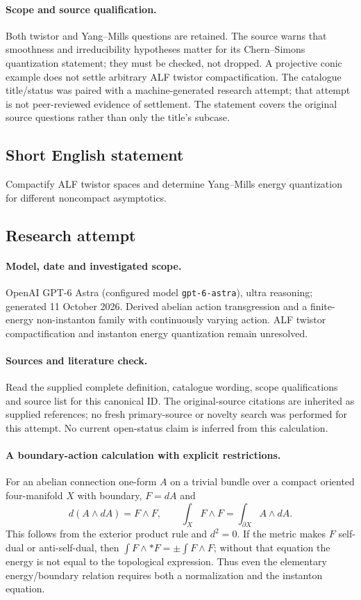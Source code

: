 \documentclass[11pt]{article}
\begin{document}
\paragraph{Scope and source qualification.}Both twistor and Yang–Mills questions are retained. The source warns that smoothness and irreducibility hypotheses matter for its Chern–Simons quantization statement; they must be checked, not dropped. A projective conic example does not settle arbitrary ALF twistor compactification. The catalogue title/status was paired with a machine-generated research attempt; that attempt is not peer-reviewed evidence of settlement. The statement covers the original source questions rather than only the title’s subcase.
\subsection{Short English statement}
Compactify ALF twistor spaces and determine Yang–Mills energy quantization for different noncompact asymptotics.
\subsection{Research attempt}
\paragraph{Model, date and investigated scope.}
OpenAI GPT-6 Astra (configured model \texttt{gpt-6-astra}), ultra reasoning; generated 11 October 2026. Derived abelian action transgression and a finite-energy non-instanton family with continuously varying action. ALF twistor compactification and instanton energy quantization remain unresolved.

\paragraph{Sources and literature check.}
Read the supplied complete definition, catalogue wording, scope qualifications and source list for this canonical ID. The original-source citations are inherited as supplied references; no fresh primary-source or novelty search was performed for this attempt. No current open-status claim is inferred from this calculation.

\paragraph{A boundary-action calculation with explicit restrictions.}For an abelian connection one-form \(A\) on a trivial bundle over a compact oriented four-manifold \(X\) with boundary, \(F=dA\) and
\[d(A\wedge dA)=F\wedge F,\qquad \int_XF\wedge F=\int_{\partial X}A\wedge dA.
\]
This follows from the exterior product rule and \(d^2=0\). If the metric makes \(F\) self-dual or anti-self-dual, then \(\int F\wedge *F=\pm\int F\wedge F\); without that equation the energy is not equal to the topological expression. Thus even the elementary energy/boundary relation requires both a normalization and the instanton equation.
\end{document}
